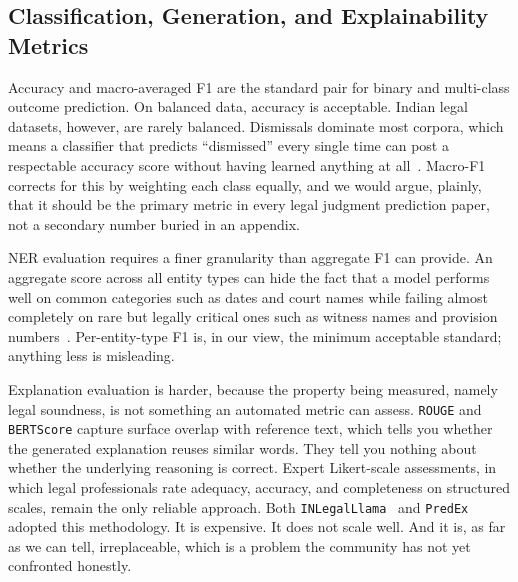 \subsection{Classification, Generation, and Explainability Metrics}

Accuracy and macro-averaged F1 are the standard pair for binary and multi-class outcome prediction. On balanced data, accuracy is acceptable. Indian legal datasets, however, are rarely balanced. Dismissals dominate most corpora, which means a classifier that predicts ``dismissed'' every single time can post a respectable accuracy score without having learned anything at all~\cite{medvedeva-etal-2020-echr}. Macro-F1 corrects for this by weighting each class equally, and we would argue, plainly, that it should be the primary metric in every legal judgment prediction paper, not a secondary number buried in an appendix.

NER evaluation requires a finer granularity than aggregate F1 can provide. An aggregate score across all entity types can hide the fact that a model performs well on common categories such as dates and court names while failing almost completely on rare but legally critical ones such as witness names and provision numbers~\cite{kalamkar-etal-2022-ner}. Per-entity-type F1 is, in our view, the minimum acceptable standard; anything less is misleading.

Explanation evaluation is harder, because the property being measured, namely legal soundness, is not something an automated metric can assess. \texttt{ROUGE} and \texttt{BERTScore} capture surface overlap with reference text, which tells you whether the generated explanation reuses similar words. They tell you nothing about whether the underlying reasoning is correct. Expert Likert-scale assessments, in which legal professionals rate adequacy, accuracy, and completeness on structured scales, remain the only reliable approach. Both \texttt{INLegalLlama}~\cite{nigam-etal-2025-nyayaanumana} and \texttt{PredEx}~\cite{nigam-etal-2024-predex} adopted this methodology. It is expensive. It does not scale well. And it is, as far as we can tell, irreplaceable, which is a problem the community has not yet confronted honestly.
